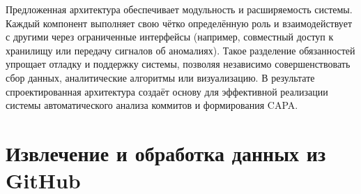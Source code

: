 Предложенная архитектура обеспечивает модульность и расширяемость системы. Каждый компонент выполняет свою чётко определённую роль и взаимодействует с другими через ограниченные интерфейсы (например, совместный доступ к хранилищу или передачу сигналов об аномалиях). Такое разделение обязанностей упрощает отладку и поддержку системы, позволяя независимо совершенствовать сбор данных, аналитические алгоритмы или визуализацию. В результате спроектированная архитектура создаёт основу для эффективной реализации системы автоматического анализа коммитов и формирования CAPA.

\section{Извлечение и обработка данных из GitHub} \label{ch3:sec2}

